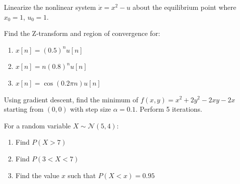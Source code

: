 \begin{exercise}
Linearize the nonlinear system $\dot{x} = x^2 - u$ about the equilibrium point where $x_0 = 1$, $u_0 = 1$.
\end{exercise}

\begin{exercise}
Find the Z-transform and region of convergence for:
\begin{enumerate}[label=(\alph*)]
    \item $x[n] = (0.5)^n u[n]$
    \item $x[n] = n(0.8)^n u[n]$
    \item $x[n] = \cos(0.2\pi n)u[n]$
\end{enumerate}
\end{exercise}

\begin{exercise}
Using gradient descent, find the minimum of $f(x,y) = x^2 + 2y^2 - 2xy - 2x$ starting from $(0,0)$ with step size $\alpha = 0.1$. Perform 5 iterations.
\end{exercise}

\begin{exercise}
For a random variable $X \sim \mathcal{N}(5, 4)$:
\begin{enumerate}[label=(\alph*)]
    \item Find $P(X > 7)$
    \item Find $P(3 < X < 7)$
    \item Find the value $x$ such that $P(X < x) = 0.95$
\end{enumerate}
\end{exercise}
